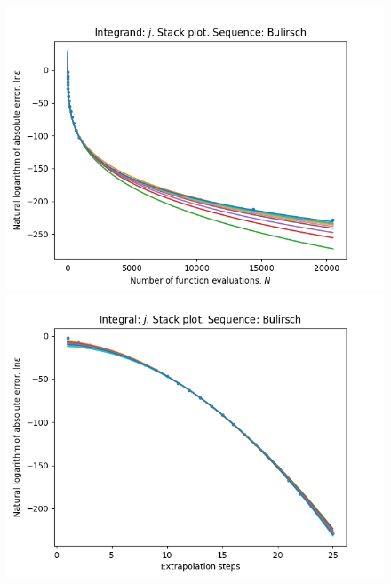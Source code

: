\begin{figure}[H]
\centering
\begin{minipage}{0.45\textwidth}
\centering
\includegraphics[scale=0.45]{../results/romberg_plots/gaussian_hp_bulirsch_stack.png}
\end{minipage}
\begin{minipage}{0.45\textwidth}
\centering
\includegraphics[scale=0.45]{../results/romberg_plots/gaussian_hp_bulirsch_steps_stack.png}
\end{minipage}
\end{figure}

